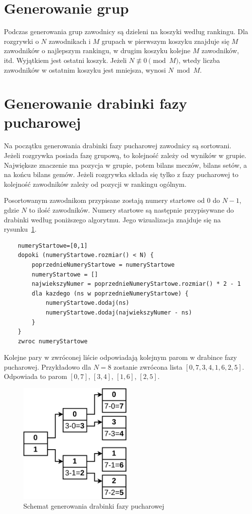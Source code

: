 \documentclass[shortabstract]{iithesis}
\begin{document}
\section{Generowanie grup}
Podczas generowania grup zawodnicy są dzieleni na koszyki według rankingu.
Dla rozgrywki o $N$ zawodnikach i $M$ grupach w pierwszym koszyku znajduje się $M$ zawodników o najlepszym rankingu, w drugim koszyku kolejne $M$ zawodników, itd.
Wyjątkiem jest ostatni koszyk. Jeżeli $N \not\equiv 0 \pmod{M}$, wtedy liczba zawodników w ostatnim koszyku jest mniejsza, wynosi $N\bmod{M}$.
\section{Generowanie drabinki fazy pucharowej}
Na początku generowania drabinki fazy pucharowej zawodnicy są sortowani. Jeżeli rozgrywka posiada fazę grupową, to kolejność zależy od wyników w grupie.
Największe znaczenie ma pozycja w grupie, potem bilans meczów, bilans setów, a na końcu bilans gemów.
Jeżeli rozgrywka składa się tylko z fazy pucharowej to kolejność zawodników zależy od pozycji w rankingu ogólnym.

Posortowanym zawodnikom przypisane zostają numery startowe od $0$ do $N-1$, gdzie $N$ to ilość zawodników.
Numery startowe są następnie przypisywane do drabinki według poniższego algorytmu. Jego wizualizacja znajduje się na rysunku~\ref{fig:knockout_bracket_generation}.
\begin{lstlisting}
    numeryStartowe=[0,1]
    dopoki (numeryStartowe.rozmiar() < N) {
        poprzednieNumeryStartowe = numeryStartowe
        numeryStartowe = []
        najwiekszyNumer = poprzednieNumeryStartowe.rozmiar() * 2 - 1
        dla kazdego (ns w poprzednieNumeryStartowe) {
            numeryStartowe.dodaj(ns)
            numeryStartowe.dodaj(najwiekszyNumer - ns)
        }
    }
    zwroc numeryStartowe
\end{lstlisting}
Kolejne pary w zwróconej liście odpowiadają kolejnym parom w drabince fazy pucharowej.
Przykładowo dla $N=8$ zostanie zwrócona lista $[0, 7, 3, 4, 1, 6, 2, 5]$. Odpowiada to parom
$[0, 7]$, $[3, 4]$, $[1, 6]$, $[2, 5]$.
\begin{figure}[H]
    \centering
    \includegraphics[width=0.5\textwidth]{assets/generowanie_drabinki.png}
    \caption{Schemat generowania drabinki fazy pucharowej}
    \label{fig:knockout_bracket_generation}
\end{figure}
\end{document}
